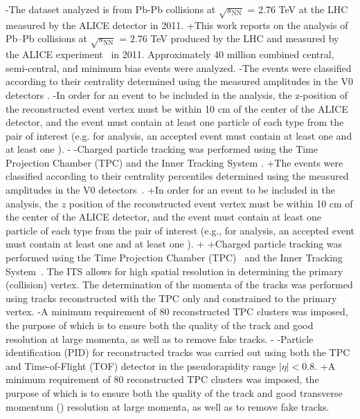 -The dataset analyzed is from Pb-Pb collisions at $\sqrt{s_{\mathrm{NN}}}$ = 2.76 TeV at the LHC measured by the ALICE detector \cite{1748-0221-3-08-S08002} in 2011.
+This work reports on the analysis of Pb--Pb collisions at $\sqrt{s_{\mathrm{NN}}}$ = 2.76 TeV produced by the LHC and measured by the ALICE experiment~\cite{Aamodt:2008zz} in 2011.
 Approximately 40 million combined central, semi-central, and minimum bias events were analyzed.
-The events were classified according to their centrality determined using the measured amplitudes in the V0 detectors \cite{Abelev:2013qoq}.  
-In order for an event to be included in the analysis, the z-position of the reconstructed event vertex must be within 10 cm of the center of the ALICE detector, and the event must contain at least one particle of each type from the pair of interest (e.g. for \LamKs analysis, an accepted event must contain at least one \Lam and at least one \Ks). 
-
-Charged particle tracking was performed using the Time Projection Chamber (TPC) \cite{2010NIMPA.622..316A} and the Inner Tracking System \cite{0954-3899-41-8-087002}.  
+The events were classified according to their centrality percentiles determined using the measured amplitudes in the V0 detectors~\cite{Abelev:2013qoq}.  
+In order for an event to be included in the analysis, the $z$ position of the reconstructed event vertex must be within 10 cm of the center of the ALICE detector, and the event must contain at least one particle of each type from the pair of interest (e.g., for \LamKs analysis, an accepted event must contain at least one \Lam and at least one \Ks). 
+
+Charged particle tracking was performed using the Time Projection Chamber (TPC)~\cite{2010NIMPA.622..316A} and the Inner Tracking System~\cite{Abelevetal:2014dna}.  
 The ITS allows for high spatial resolution in determining the primary (collision) vertex.
 The determination of the momenta of the tracks was performed using tracks reconstructed with the TPC only and constrained to the primary vertex.
-A minimum requirement of 80 reconstructed TPC clusters was imposed, the purpose of which is to ensure both the quality of the track and good \pt resolution at large momenta, as well as to remove fake tracks.
-
-Particle identification (PID) for reconstructed tracks was carried out using both the TPC and Time-of-Flight (TOF) detector \cite{Abelev:2014ffa, Akindinov:2013tea} in the pseudorapidity range $|\eta| < 0.8$.  
+A minimum requirement of 80 reconstructed TPC clusters was imposed, the purpose of which is to ensure both the quality of the track and good transverse momentum (\pt) resolution at large momenta, as well as to remove fake tracks.
